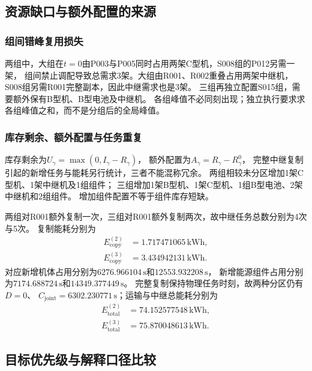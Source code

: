 \documentclass[bwprint]{gmcmthesis}
\begin{document}
\subsection{资源缺口与额外配置的来源}
\subsubsection{组间错峰复用损失}
两组中，大组在$t=0$由P003与P005同时占用两架C型机，S008组的P012另需一架，
组间禁止调配导致总需求3架。大组由R001、R002重叠占用两架中继机，
S008组另需R001完整副本，因此中继需求也是3架。
三组再独立配置S015组，需要额外保有B型机、B型电池及中继机。
各组峰值不必同刻出现；独立执行要求求各组峰值之和，而不是分组后的全局峰值。

\subsubsection{库存剩余、额外配置与任务重复}
库存剩余为$U_\gamma=\max(0,I_\gamma-R_\gamma)$，
额外配置为$A_\gamma=R_\gamma-R^0_\gamma$，
完整中继复制引起的新增任务与能耗另行统计，三者不能混称冗余。
两组相较未分区增加1架C型机、1架中继机及1组组件；
三组增加1架B型机、1架C型机、1组B型电池、2架中继机和2组组件。
增加组件配置不等于组件库存短缺。

两组对R001额外复制一次，三组对R001额外复制两次，故中继任务总数分别为4次与5次。
复制能耗分别为
\begin{align}
E_{\mathrm{copy}}^{(2)}&=1.717471065\,\mathrm{kWh},\\
E_{\mathrm{copy}}^{(3)}&=3.434942131\,\mathrm{kWh}.
\end{align}
对应新增机体占用分别为$6276.966104\,\mathrm{s}$和$12553.932208\,\mathrm{s}$，
新增能源组件占用分别为$7174.688724\,\mathrm{s}$和$14349.377449\,\mathrm{s}$。
完整复制保持物理任务时刻，故两种分区仍有$D=0$、
$C_{\mathrm{joint}}=6302.230771\,\mathrm{s}$；运输与中继总能耗分别为
\begin{align}
E_{\mathrm{total}}^{(2)}&=74.152577548\,\mathrm{kWh},\\
E_{\mathrm{total}}^{(3)}&=75.870048613\,\mathrm{kWh}.
\end{align}

\subsection{目标优先级与解释口径比较}
\end{document}
